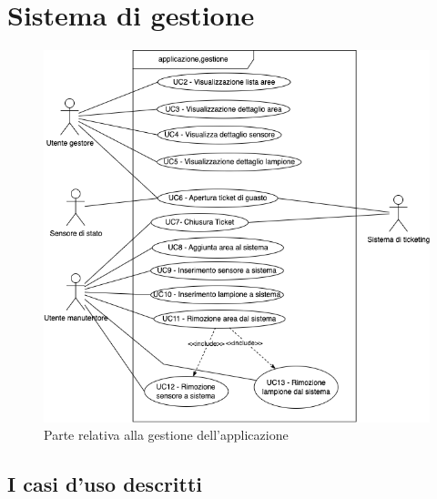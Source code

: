 
\section{Sistema di gestione}

\begin{figure}[H]
    \includegraphics[width=\textwidth]{contenuti/img/casi_uso_grafici-applicazione,gestione.png}
    \caption{Parte relativa alla gestione dell'applicazione}
    \label{fig:gestione}
\end{figure}

\subsection{I casi d'uso descritti}

